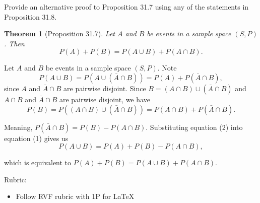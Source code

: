 \documentclass{article}
\newtheorem*{theorem}{Theorem}
\theoremstyle{definition}
\begin{document}
\begin{question}
    Provide an alternative proof to Proposition 31.7 using any of the statements in Proposition 31.8.
    \begin{theorem}[Proposition 31.7]
    Let $A$ and $B$ be events in a sample space $(S, P)$. Then 
    \[ P(A) + P(B) = P(A\cup B) + P(A\cap B).\]
    \end{theorem}
\end{question}
\begin{solution}
Let $A$ and $B$ be events in a sample space $(S, P)$. Note 
\begin{equation}
P(A\cup B) = P(A\cup ( \bar{A} \cap B)) = P(A) + P(\bar{A} \cap B),
\end{equation}
since $A$ and $\bar{A}\cap B$ are pairwise disjoint. Since $B = ( A\cap B) \cup (\bar{A} \cap B)$ and $A\cap B$ and $ \bar{A} \cap B$ are pairwise disjoint, we have
\begin{equation}
P(B) = P((A\cap B) \cup (\bar{A} \cap B)) = P(A\cap B) +P(\bar{A} \cap B).
\end{equation}

Meaning, $P(\bar{A} \cap B) = P(B)-P(A\cap B)$. Substituting equation (2) into equation (1) gives us
\[
P(A\cup B) = P(A) + P(B)-P(A\cap B),
\]

which is equivalent to  $P(A) + P(B) = P(A\cup B) + P(A\cap B)$.

{\color{red} Rubric:
\begin{itemize}
\item Follow RVF rubric with 1P for \LaTeX
\end{itemize}}
\end{solution}
\end{document}
